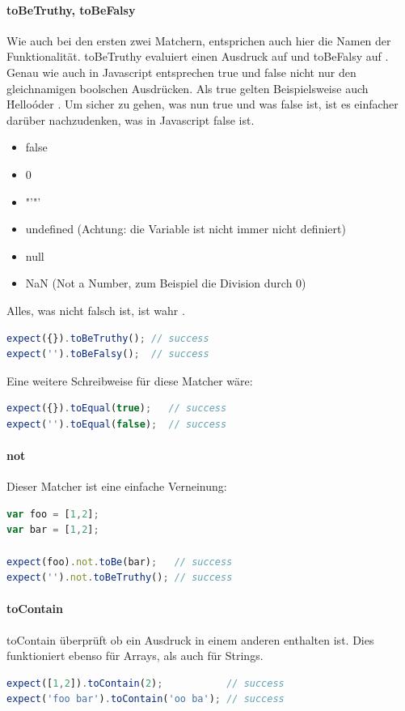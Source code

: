 \paragraph{toBeTruthy, toBeFalsy}
Wie auch bei den ersten zwei Matchern, entsprichen auch hier die Namen der Funktionalität. toBeTruthy evaluiert einen Ausdruck auf  und toBeFalsy auf . Genau wie auch in Javascript entsprechen true und false nicht nur den gleichnamigen boolschen Ausdrücken. Als true gelten Beispielsweise auch \'Hello\' oder {}. Um sicher zu gehen, was nun true und was false ist, ist es einfacher darüber nachzudenken, was in Javascript false ist.
\begin{itemize}
  \item false
  \item 0
  \item "'"'
  \item undefined (Achtung: die Variable  ist nicht immer nicht definiert)
  \item null
  \item NaN (Not a Number, zum Beispiel die Division durch 0)
\end{itemize}
Alles, was nicht falsch ist, ist wahr \autocite[17]{Hahn:2013}.
\begin{lstlisting}[language=JavaScript]
expect({}).toBeTruthy(); // success
expect('').toBeFalsy();  // success
\end{lstlisting}
Eine weitere Schreibweise für diese Matcher wäre:
\begin{lstlisting}[language=JavaScript]
expect({}).toEqual(true);   // success
expect('').toEqual(false);  // success
\end{lstlisting}

\paragraph{not}
Dieser Matcher ist eine einfache Verneinung:
\begin{lstlisting}[language=JavaScript]
var foo = [1,2];
var bar = [1,2];

expect(foo).not.toBe(bar);   // success
expect('').not.toBeTruthy(); // success
\end{lstlisting}

\paragraph{toContain}
toContain überprüft ob ein Ausdruck in einem anderen enthalten ist. Dies funktioniert ebenso für Arrays, als auch für Strings.
\begin{lstlisting}[language=JavaScript]
expect([1,2]).toContain(2);           // success
expect('foo bar').toContain('oo ba'); // success
\end{lstlisting}


